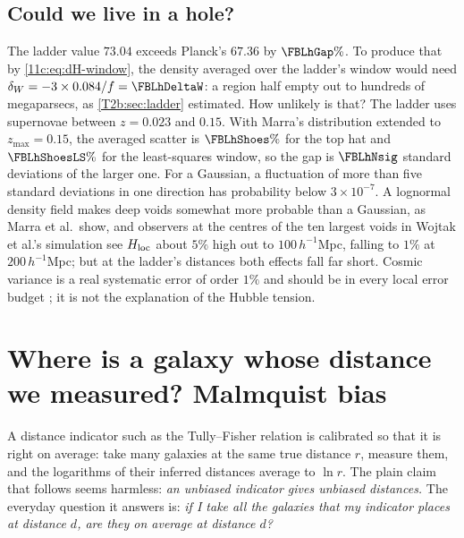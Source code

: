 \subsection{Could we live in a hole?}
\label{11c:sec:tension-void}

The ladder value $73.04$ exceeds Planck's $67.36$ by $\FBLhGap\%$. To produce that by
\eqref{11c:eq:dH-window}, the density averaged over the ladder's window would need
$\delta_W=-3\times0.084/f=\FBLhDeltaW$: a region half empty out to hundreds of
megaparsecs, as \cref{T2b:sec:ladder} estimated. How unlikely is that? The ladder uses
supernovae between $z=0.023$ and $0.15$. With Marra's distribution extended to
$z_{\max}=0.15$, the averaged scatter is $\FBLhShoes\%$ for the top hat and
$\FBLhShoesLS\%$ for the least-squares window, so the gap is $\FBLhNsig$ standard
deviations of the larger one. For a Gaussian, a fluctuation of more than five
standard deviations in one direction has probability below $3\times10^{-7}$. A lognormal density field makes deep
voids somewhat more probable than a Gaussian, as Marra et al.\ show, and observers
at the centres of the ten largest voids in Wojtak et al.'s simulation see
$H_{\rm loc}$ about $5\%$ high out to $100\,h^{-1}$Mpc, falling to $1\%$ at $200\,h^{-1}$Mpc; but at the ladder's distances both effects fall far
short. Cosmic variance is a real systematic error of order $1\%$ and should be in
every local error budget \cite[Sec.~IV.F]{Abdalla2022}; it is not the explanation of
the Hubble tension.
\section{Where is a galaxy whose distance we measured? Malmquist bias}
\label{11c:sec:ihm}

A distance indicator such as the Tully--Fisher relation is calibrated so that it is
right on average: take many galaxies at the same true distance $r$, measure them,
and the logarithms of their inferred distances average to $\ln r$. The plain claim
that follows seems harmless: \emph{an unbiased indicator gives unbiased distances.}
The everyday question it answers is: \emph{if I take all the galaxies that my
indicator places at distance $d$, are they on average at distance $d$?}

